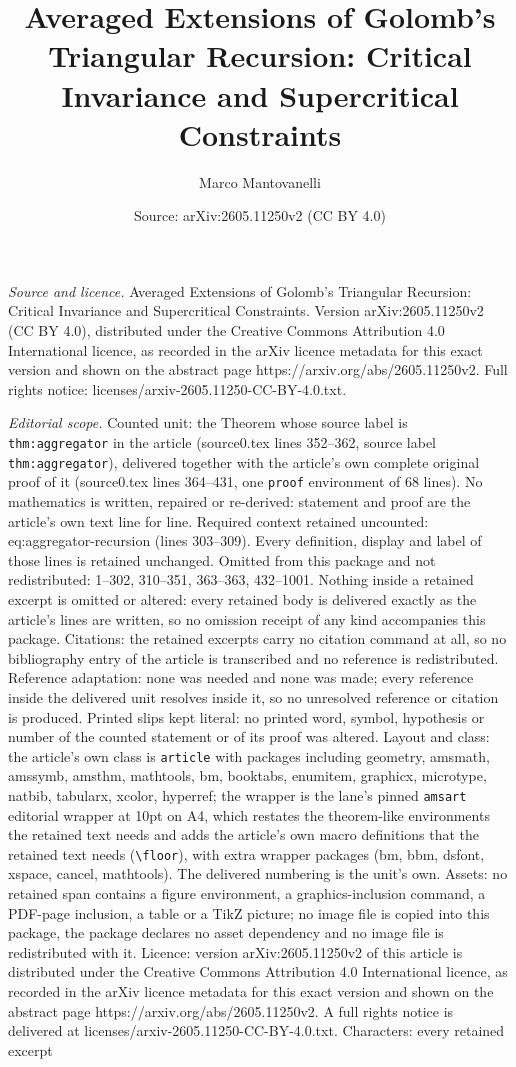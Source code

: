 \documentclass[10pt,a4paper]{amsart}
\title[Averaged Extensions of Golomb's Triangular Recursion: Critic]{Averaged Extensions of Golomb's Triangular Recursion: Critical Invariance and Supercritical Constraints}
\author{Marco Mantovanelli}
\date{Source: arXiv:2605.11250v2 (CC BY 4.0)}
\begin{document}
\maketitle

\noindent\emph{Source and licence.} Averaged Extensions of Golomb's Triangular Recursion: Critical Invariance and Supercritical Constraints. Version arXiv:2605.11250v2 (CC BY 4.0), distributed under the Creative Commons Attribution 4.0 International licence, as recorded in the arXiv licence metadata for this exact version and shown on the abstract page https://arxiv.org/abs/2605.11250v2. Full rights notice: licenses/arxiv-2605.11250-CC-BY-4.0.txt.\par\smallskip

\noindent\textit{Editorial scope.} Counted unit: the Theorem whose source label is \texttt{thm:aggregator} in the article (source0.tex lines 352--362, source label \texttt{thm:aggregator}), delivered together with the article's own complete original proof of it (source0.tex lines 364--431, one \texttt{proof} environment of 68 lines). No mathematics is written, repaired or re-derived: statement and proof are the article's own text line for line. Required context retained uncounted: eq:aggregator-recursion (lines 303--309). Every definition, display and label of those lines is retained unchanged. Omitted from this package and not redistributed: 1--302, 310--351, 363--363, 432--1001. Nothing inside a retained excerpt is omitted or altered: every retained body is delivered exactly as the article's lines are written, so no omission receipt of any kind accompanies this package. Citations: the retained excerpts carry no citation command at all, so no bibliography entry of the article is transcribed and no reference is redistributed. Reference adaptation: none was needed and none was made; every reference inside the delivered unit resolves inside it, so no unresolved reference or citation is produced. Printed slips kept literal: no printed word, symbol, hypothesis or number of the counted statement or of its proof was altered. Layout and class: the article's own class is \texttt{article} with packages including geometry, amsmath, amssymb, amsthm, mathtools, bm, booktabs, enumitem, graphicx, microtype, natbib, tabularx, xcolor, hyperref; the wrapper is the lane's pinned \texttt{amsart} editorial wrapper at 10pt on A4, which restates the theorem-like environments the retained text needs and adds the article's own macro definitions that the retained text needs (\texttt{\textbackslash floor}), with extra wrapper packages (bm, bbm, dsfont, xspace, cancel, mathtools). The delivered numbering is the unit's own. Assets: no retained span contains a figure environment, a graphics-inclusion command, a PDF-page inclusion, a table or a TikZ picture; no image file is copied into this package, the package declares no asset dependency and no image file is redistributed with it. Licence: version arXiv:2605.11250v2 of this article is distributed under the Creative Commons Attribution 4.0 International licence, as recorded in the arXiv licence metadata for this exact version and shown on the abstract page https://arxiv.org/abs/2605.11250v2. A full rights notice is delivered at licenses/arxiv-2605.11250-CC-BY-4.0.txt. Characters: every retained excerpt 
\end{document}
